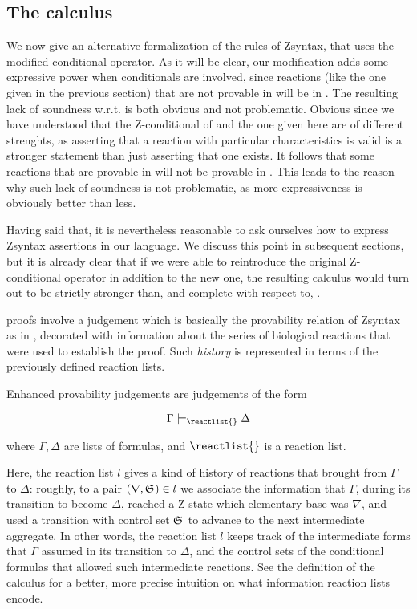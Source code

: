 \subsection{The calculus \eznd{}}

We now give an alternative formalization of the rules of Zsyntax, that uses the
modified conditional operator. As it will be clear, our modification adds some
expressive power when conditionals are involved, since reactions (like the one
given in the previous section) that are not provable in \znd{} will be in
\eznd{}.  The resulting lack of soundness w.r.t. \znd{} is both obvious and not
problematic. Obvious since we have understood that the Z-conditional of \znd{}
and the one given here are of different strenghts, as asserting that a reaction
with particular characteristics is valid is a stronger statement than just
asserting that one exists. It follows that some reactions that are provable in
\eznd{} will not be provable in \znd{}. This leads to the reason why such lack
of soundness is not problematic, as more expressiveness is obviously better than
less.

Having said that, it is nevertheless reasonable to ask ourselves how to express
Zsyntax assertions in our language. We discuss this point in subsequent
sections, but it is already clear that if we were able to reintroduce the
original Z-conditional operator in addition to the new one, the resulting
calculus would turn out to be strictly stronger than, and complete with respect
to, \znd{}.

\eznd{} proofs involve a judgement which is basically the provability relation
of Zsyntax as in \cite{adding-logic}, decorated with information about the
series of biological reactions that were used to establish the proof. Such
\emph{history} is represented in terms of the previously defined reaction lists.

\begin{definition}
  Enhanced provability judgements are judgements of the form

  \[
    \Gamma \models_{\reactlist{}} \Delta
  \]

  where $\Gamma, \Delta$ are lists of formulas, and $\reactlist{}$ is a reaction
  list.
\end{definition}

Here, the reaction list $l$ gives a kind of history of reactions that brought
from $\Gamma$ to $\Delta$: roughly, to a pair $(\nabla, \mathfrak{S}_{}) \in l$ we
associate the information that $\Gamma$, during its transition to become
$\Delta$, reached a Z-state which elementary base was $\nabla$, and used a
transition with control set $\mathfrak{S}_{}$ to advance to the next intermediate
aggregate.  In other words, the reaction list $l$ keeps track of the
intermediate forms that $\Gamma$ assumed in its transition to $\Delta$, and the
control sets of the conditional formulas that allowed such intermediate
reactions. See the definition of the calculus for a better, more precise
intuition on what information reaction lists encode.

